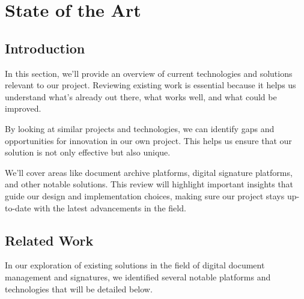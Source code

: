 \documentclass[a4paper,11pt]{article}
\begin{document}
    \clearpage
    \section{State of the Art}\label{sec:soa}

        \subsection{Introduction}
        \quad In this section, we'll provide an overview of current technologies and solutions relevant to our project. Reviewing existing work is essential because it helps us understand what's already out there, what works well, and what could be improved.

        By looking at similar projects and technologies, we can identify gaps and opportunities for innovation in our own project. This helps us ensure that our solution is not only effective but also unique.
        
        We'll cover areas like document archive platforms, digital signature platforms, and other notable solutions. This review will highlight important insights that guide our design and implementation choices, making sure our project stays up-to-date with the latest advancements in the field.
        
        \subsection{Related Work}
            \quad In our exploration of existing solutions in the field of digital document management and signatures, we identified several notable platforms and technologies that will be detailed below.
        
\end{document}
